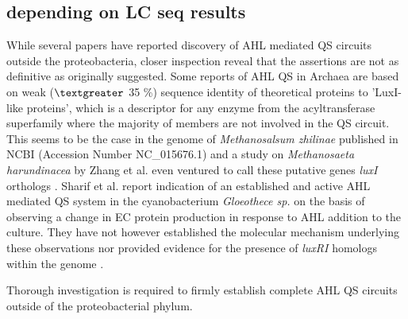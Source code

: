 \documentclass[11pt]{article}
\begin{document}
\subsection{depending on LC seq results}
While several papers have reported discovery of AHL mediated QS circuits outside the proteobacteria, closer inspection reveal that the assertions are not as definitive as originally suggested. Some reports of AHL QS in Archaea are based on weak ($\textgreater$ 35 \%) sequence identity of theoretical proteins to 'LuxI-like proteins', which is a descriptor for any enzyme from the acyltransferase superfamily where the majority of members are not involved in the QS circuit. This seems to be the case in the genome of \emph{Methanosalsum zhilinae} published in NCBI (Accession Number NC\_015676.1) and a study on \emph{Methanosaeta harundinacea} by Zhang et al. even ventured to call these putative genes \emph{luxI} orthologs \cite{zhang2012}. Sharif et al. report indication of an established and active AHL mediated QS system in the cyanobacterium \emph{Gloeothece sp.} on the basis of observing a change in EC protein production in response to AHL addition to the culture. They have not however established the molecular mechanism underlying these observations nor provided evidence for the presence of \emph{luxRI} homologs within the genome \cite{sharif2008}. 


Thorough investigation is required to firmly establish complete AHL QS circuits outside of the proteobacterial phylum. 
\end{document}
